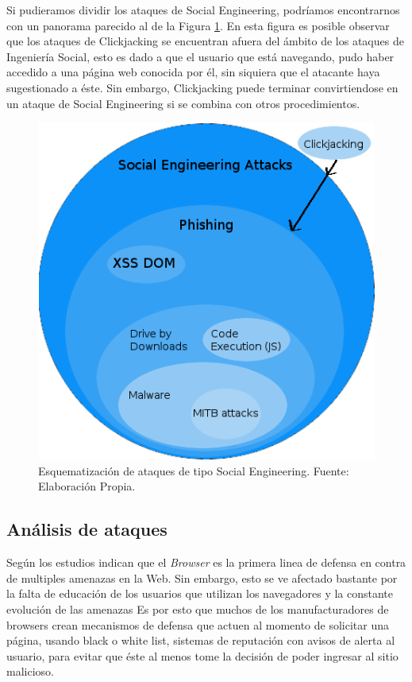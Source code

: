 Si pudieramos dividir los ataques de Social Engineering, podríamos encontrarnos con un panorama parecido al de la Figura \ref{fig:SEattack}. En esta figura es posible observar que los ataques de Clickjacking se encuentran afuera del ámbito de los ataques de  Ingeniería Social, esto es dado a que el usuario que está navegando, pudo haber accedido a una página web conocida por él, sin siquiera que el atacante haya sugestionado a éste. Sin embargo, Clickjacking puede terminar convirtiendose en un ataque de Social Engineering si se combina con otros procedimientos.

	\begin{figure}[h!t]
        \centering
        \includegraphics[scale=0.5]{figures/SEAttacks.png}
        \caption{Esquematización de ataques de tipo Social Engineering. Fuente: Elaboración Propia.}
        \label{fig:SEattack}
    \end{figure}

 	\subsection{Análisis de ataques}
	Según los estudios \cite{browSecPhish, Labs2013, rowSecSEMBlock} indican que el \textit{Browser} es la primera linea de defensa en contra de multiples amenazas en la Web. Sin embargo, esto se ve afectado bastante por la falta de educación de los usuarios que utilizan los navegadores y la constante evolución de las amenazas \cite{browSecPhish} Es por esto que muchos de los manufacturadores de browsers crean mecanismos de defensa \cite{Drake2011} que actuen al momento de solicitar una página, usando black o white list, sistemas de reputación \cite{Rajab2013} con avisos de alerta al usuario, para evitar que éste al menos tome la decisión de poder ingresar al sitio malicioso.

